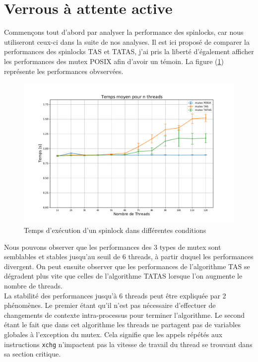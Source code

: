 \section{Verrous à attente active}

Commençons tout d'abord par analyser la performance des spinlocks, car nous utiliseront ceux-ci dans la suite de nos analyses. Il est ici proposé de comparer
la performances des spinlocks TAS et TATAS, j'ai pris la liberté d'également afficher les performances des mutex POSIX afin d'avoir un témoin. La figure (\ref{pic:spinlock}) représente les performances obvservées.\\

\begin{figure}[h]
    \centering
    \includegraphics[scale=0.4]{img/spinlock.pdf}
    \caption{Temps d'exécution d'un spinlock dans différentes conditions}
    \label{pic:spinlock}
\end{figure}

\noindent Nous pouvons observer que les performances des 3 types de mutex sont semblables et stables jusqu'au seuil de 6 threads, à partir duquel les performances divergent.
On peut ensuite observer que les performances de l'algorithme TAS se dégradent plus vite que celles de l'algorithme TATAS lorsque l'on augmente le nombre de threads. \\

\noindent La stabilité des performances jusqu'à 6 threads peut être expliquée par 2 phénomènes. Le premier étant qu'il n'est pas nécessaire d'effectuer de changements de contexte intra-processus pour terminer l'algorithme. Le second étant le fait que dans cet algorithme les threads ne partagent pas de variables globales à l'exception du mutex. Cela signifie que les appels répétés aux instructions \texttt{xchg} n'impactent pas la vitesse de travail du thread se trouvant dans sa section critique.\\[0.1cm]

